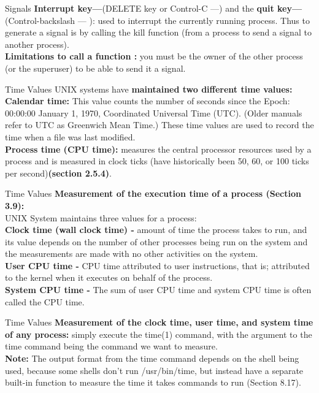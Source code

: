 \documentclass[newPxFont,sthlmFooter,nooffset]{beamer}
\begin{document}
\begin{frame}[t]{Signals}
\textbf{Interrupt key—}(DELETE key or Control-C —) and the \textbf{quit key—}(Control-backslash — ): used to interrupt the currently running process. Thus to generate a signal is by calling the kill function (from a process to send a signal to another process).\\[6pt]
\textbf{Limitations to call a function :} you must be the owner of the other process (or the superuser) to be able to send it a signal.


\end{frame}
\begin{frame}[t]{Time Values}
UNIX systems have \textbf{maintained two different time values:}
\textbf{Calendar time:} This value counts the number of seconds since the Epoch: 00:00:00 January 1, 1970, Coordinated Universal Time (UTC). (Older manuals refer to UTC as Greenwich Mean Time.) These time values are used to record the time when a file was last modified.
\\[6pt]\textbf{Process time (CPU time):} measures the central processor resources used by a process and is measured in clock ticks (have historically been 50, 60, or 100 ticks per second)\textbf{(section 2.5.4)}.

\end{frame}

\begin{frame}[t]{Time Values}
\textbf{Measurement of  the execution time of a process (Section 3.9):}
\\[4pt]UNIX System maintains three values for a process:
\\[6pt]\textbf{Clock time (wall clock time) -} amount of time the process takes to run, and its value depends on the number of other processes being run on the system and the measurements are made with no other activities on the system.
\\[3pt]\textbf{User CPU time -} CPU time attributed to user instructions, that is; attributed to the kernel when it executes on behalf of the process. 
\\[3pt]\textbf{System CPU time -} The sum of user CPU time and system CPU time is often called the CPU time.
\


\end{frame}
\begin{frame}[t]{Time Values}
\textbf{Measurement of the clock time, user time, and system time of any process:} simply execute the time(1) command, with the argument to the time command being the command we want to measure.\\[6pt]
\textbf{Note:} The output format from the time command depends on the shell being used, because some shells don’t run /usr/bin/time, but instead have a separate built-in function to measure the time it takes commands to run (Section 8.17).
\end{frame}
\end{document}
